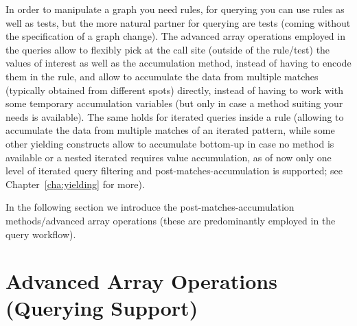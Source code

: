 
In order to manipulate a graph you need rules, for querying you can use rules as well as tests, but the more natural partner for querying are tests (coming without the specification of a graph change).
The advanced array operations employed in the queries allow to flexibly pick at the call site (outside of the rule/test) the values of interest as well as the accumulation method, instead of having to encode them in the rule, and allow to accumulate the data from multiple matches (typically obtained from different spots) directly, instead of having to work with some temporary accumulation variables (but only in case a method suiting your needs is available).
The same holds for iterated queries inside a rule (allowing to accumulate the data from multiple matches of an iterated pattern, while some other yielding constructs allow to accumulate bottom-up in case no method is available or a nested iterated requires value accumulation, as of now only one level of iterated query filtering and post-matches-accumulation is supported; see Chapter~\ref{cha:yielding} for more).

In the following section we introduce the post-matches-accumulation methods/advanced array operations (these are predominantly employed in the query workflow).

\section{Advanced Array Operations (Querying Support)}\label{sec:accumulation}

